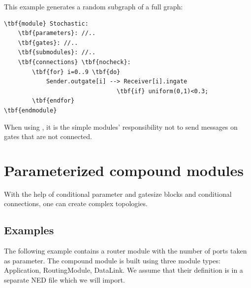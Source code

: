 This example generates a random subgraph of a full graph:


\begin{Verbatim}[commandchars=\\\{\}]
\tbf{module} Stochastic:
    \tbf{parameters}: //..
    \tbf{gates}: //..
    \tbf{submodules}: //..
    \tbf{connections} \tbf{nocheck}:
        \tbf{for} i=0..9 \tbf{do}
            Sender.outgate[i] --> Receiver[i].ingate
                                \tbf{if} uniform(0,1)<0.3;
        \tbf{endfor}
\tbf{endmodule}
\end{Verbatim}


When using , it is the simple modules' responsibility 
not to send messages on gates that are not connected.





\section{Parameterized compound modules}


With the help of conditional parameter and gatesize blocks and 
conditional connections, one can create complex topologies.





\subsection{Examples}


The following example contains a router module with the number of
ports taken as parameter. The compound module is built using three
module types: Application, RoutingModule, DataLink. We assume that
their definition is in a separate NED file which we will import.


